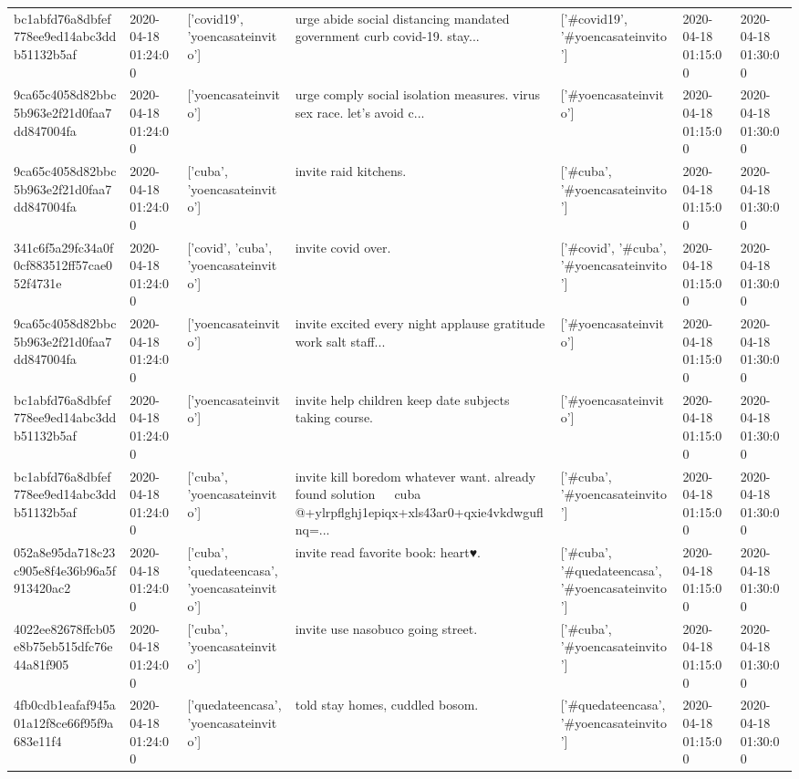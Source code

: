 \begin{tabular}{lllllll}
bc1abfd76a8dbfef778ee9ed14abc3ddb51132b5af & 2020-04-18 01:24:00 & ['covid19', 'yoencasateinvito'] & urge abide social distancing mandated government curb covid-19. stay... & ['#covid19', '#yoencasateinvito'] & 2020-04-18 01:15:00 & 2020-04-18 01:30:00 \\
9ca65c4058d82bbc5b963e2f21d0faa7dd847004fa & 2020-04-18 01:24:00 & ['yoencasateinvito'] & urge comply social isolation measures. virus sex race. let's avoid c... & ['#yoencasateinvito'] & 2020-04-18 01:15:00 & 2020-04-18 01:30:00 \\
9ca65c4058d82bbc5b963e2f21d0faa7dd847004fa & 2020-04-18 01:24:00 & ['cuba', 'yoencasateinvito'] & invite raid kitchens. & ['#cuba', '#yoencasateinvito'] & 2020-04-18 01:15:00 & 2020-04-18 01:30:00 \\
341c6f5a29fc34a0f0cf883512ff57cae052f4731e & 2020-04-18 01:24:00 & ['covid', 'cuba', 'yoencasateinvito'] & invite covid over. & ['#covid', '#cuba', '#yoencasateinvito'] & 2020-04-18 01:15:00 & 2020-04-18 01:30:00 \\
9ca65c4058d82bbc5b963e2f21d0faa7dd847004fa & 2020-04-18 01:24:00 & ['yoencasateinvito'] & invite excited every night applause gratitude work salt staff... & ['#yoencasateinvito'] & 2020-04-18 01:15:00 & 2020-04-18 01:30:00 \\
bc1abfd76a8dbfef778ee9ed14abc3ddb51132b5af & 2020-04-18 01:24:00 & ['yoencasateinvito'] & invite help children keep date subjects taking course. & ['#yoencasateinvito'] & 2020-04-18 01:15:00 & 2020-04-18 01:30:00 \\
bc1abfd76a8dbfef778ee9ed14abc3ddb51132b5af & 2020-04-18 01:24:00 & ['cuba', 'yoencasateinvito'] & invite kill boredom whatever want. already found solution 🤣🤣🤣 cuba @+ylrpflghj1epiqx+xls43ar0+qxie4vkdwguflnq=... & ['#cuba', '#yoencasateinvito'] & 2020-04-18 01:15:00 & 2020-04-18 01:30:00 \\
052a8e95da718c23c905e8f4e36b96a5f913420ac2 & 2020-04-18 01:24:00 & ['cuba', 'quedateencasa', 'yoencasateinvito'] & invite read favorite book: heart♥️. & ['#cuba', '#quedateencasa', '#yoencasateinvito'] & 2020-04-18 01:15:00 & 2020-04-18 01:30:00 \\
4022ee82678ffcb05e8b75eb515dfc76e44a81f905 & 2020-04-18 01:24:00 & ['cuba', 'yoencasateinvito'] & invite use nasobuco going street. & ['#cuba', '#yoencasateinvito'] & 2020-04-18 01:15:00 & 2020-04-18 01:30:00 \\
4fb0cdb1eafaf945a01a12f8ce66f95f9a683e11f4 & 2020-04-18 01:24:00 & ['quedateencasa', 'yoencasateinvito'] & told stay homes, cuddled bosom. & ['#quedateencasa', '#yoencasateinvito'] & 2020-04-18 01:15:00 & 2020-04-18 01:30:00 \\

\end{tabular}
